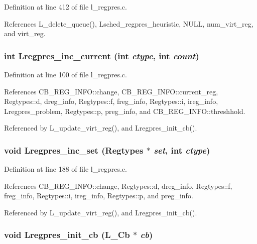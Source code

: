 Definition at line 412 of file l\_\-regpres.c.

References L\_\-delete\_\-queue(), Lsched\_\-regpres\_\-heuristic, NULL, num\_\-virt\_\-reg, and virt\_\-reg.
\subsubsection{\setlength{\rightskip}{0pt plus 5cm}int Lregpres\_\-inc\_\-current (int {\em ctype}, int {\em count})}\label{l__regpres_8c_179027718e5fae96806f8cad2c1ce5b9}




Definition at line 100 of file l\_\-regpres.c.

References CB\_\-REG\_\-INFO::change, CB\_\-REG\_\-INFO::current\_\-reg, Regtypes::d, dreg\_\-info, Regtypes::f, freg\_\-info, Regtypes::i, ireg\_\-info, Lregpres\_\-problem, Regtypes::p, preg\_\-info, and CB\_\-REG\_\-INFO::threshhold.

Referenced by L\_\-update\_\-virt\_\-reg(), and Lregpres\_\-init\_\-cb().
\subsubsection{\setlength{\rightskip}{0pt plus 5cm}void Lregpres\_\-inc\_\-set (\bf{Regtypes} $\ast$ {\em set}, int {\em ctype})}\label{l__regpres_8c_9d3717de99e535d882ba67ab4343593a}




Definition at line 188 of file l\_\-regpres.c.

References CB\_\-REG\_\-INFO::change, Regtypes::d, dreg\_\-info, Regtypes::f, freg\_\-info, Regtypes::i, ireg\_\-info, Regtypes::p, and preg\_\-info.

Referenced by L\_\-update\_\-virt\_\-reg(), and Lregpres\_\-init\_\-cb().
\subsubsection{\setlength{\rightskip}{0pt plus 5cm}void Lregpres\_\-init\_\-cb (L\_\-Cb $\ast$ {\em cb})}\label{l__regpres_8c_c5c7ebf3f69738f27a8c4b02f1e6cb60}





